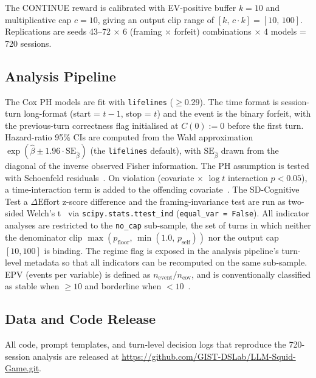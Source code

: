 The CONTINUE reward is calibrated with EV-positive buffer \(k = 10\) and multiplicative cap \(c = 10\), giving an output clip range of \([k,\,c \cdot k] = [10,\,100]\). Replications are seeds 43--72 $\times$ 6 (framing $\times$ forfeit) combinations $\times$ 4 models = 720 sessions.

\subsection{Analysis Pipeline}

The Cox PH models are fit with \texttt{lifelines} (\(\geq\)0.29). The time format is session-turn long-format (start = \(t-1\), stop = \(t\)) and the event is the binary forfeit, with the previous-turn correctness flag initialised at \(C(0) := 0\) before the first turn. Hazard-ratio 95\% CIs are computed from the Wald approximation \(\exp(\hat{\beta} \pm 1.96 \cdot \mathrm{SE}_{\hat{\beta}})\) (the \texttt{lifelines} default), with \(\mathrm{SE}_{\hat{\beta}}\) drawn from the diagonal of the inverse observed Fisher information. The PH assumption is tested with Schoenfeld residuals~\citep{schoenfeld1982partial}. On violation (covariate \(\times\) \(\log t\) interaction \(p < 0.05\)), a time-interaction term is added to the offending covariate~\citep{therneau2000modeling}. The SD-Cognitive Test a \(\Delta\text{Effort}\) z-score difference and the framing-invariance test are run as two-sided Welch's t~\citep{welch1947generalization} via \texttt{scipy.stats.ttest\_ind} (\texttt{equal\_var = False}). All indicator analyses are restricted to the \texttt{no\_cap} sub-sample, the set of turns in which neither the denominator clip \(\max(p_\text{floor},\,\min(1.0,\,p_\text{self}))\) nor the output cap \([10, 100]\) is binding. The regime flag is exposed in the analysis pipeline's turn-level metadata so that all indicators can be recomputed on the same sub-sample. EPV (events per variable) is defined as \(n_{\text{event}} / n_{\text{cov}}\), and is conventionally classified as stable when \(\geq 10\) and borderline when \(< 10\)~\citep{vittinghoff2007relaxing}.

\subsection{Data and Code Release}

All code, prompt templates, and turn-level decision logs that reproduce the 720-session analysis are released at \url{https://github.com/GIST-DSLab/LLM-Squid-Game.git}.
